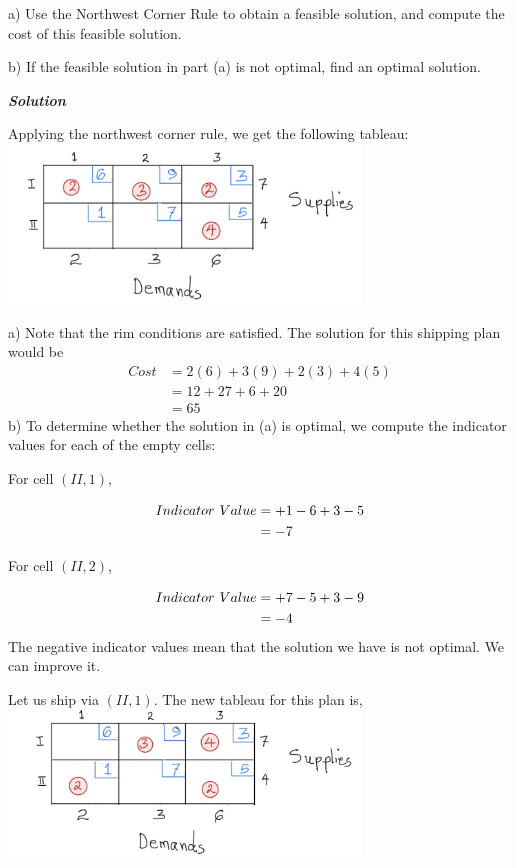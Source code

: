 \documentclass[
  letterpaper,
  DIV=11,
  numbers=noendperiod]{scrreprt}
\begin{document}
a) Use the Northwest Corner Rule to obtain a feasible solution, and
compute the cost of this feasible solution.

b) If the feasible solution in part (a) is not optimal, find an optimal
solution.

\textbf{\emph{Solution}}

Applying the northwest corner rule, we get the following tableau:
\includegraphics[width=0.7\textwidth,height=\textheight]{images/q.jpeg}

a) Note that the rim conditions are satisfied. The solution for this
shipping plan would be \[
\begin{aligned}
Cost&=2(6)+3(9)+2(3)+4(5)\\
&= 12+27+6+20\\
&=65
\end{aligned}
\] b) To determine whether the solution in (a) is optimal, we compute
the indicator values for each of the empty cells:

For cell \((II,1)\),

\[
\begin{aligned}
Indicator \hspace{.05in}Value
&=+1-6+3-5\\
&=-7
\end{aligned}
\]

For cell \((II,2)\),

\[
\begin{aligned}
Indicator \hspace{.05in}Value
&=+7-5+3-9\\
&=-4
\end{aligned}
\] The negative indicator values mean that the solution we have is not
optimal. We can improve it.

Let us ship via \((II,1)\). The new tableau for this plan is,
\includegraphics[width=0.7\textwidth,height=\textheight]{images/s.jpeg}
\end{document}
